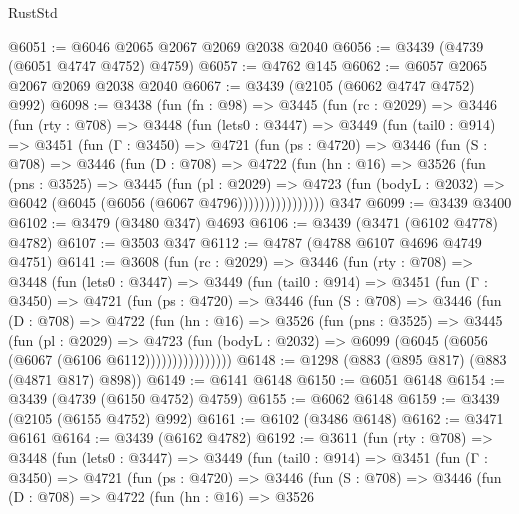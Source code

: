 \begin{lexlean}{RustStd}
\begin{coremodule}
@6051 := @6046 @2065 @2067 @2069 @2038 @2040
@6056 := @3439 (@4739 (@6051 @4747 @4752) @4759)
@6057 := @4762 @145
@6062 := @6057 @2065 @2067 @2069 @2038 @2040
@6067 := @3439 (@2105 (@6062 @4747 @4752) @992)
@6098 := @3438
    (fun (fn : @98) =>
    @3445
      (fun (rc : @2029) =>
      @3446
        (fun (rty : @708) =>
        @3448
          (fun (lets0 : @3447) =>
          @3449
            (fun (tail0 : @914) =>
            @3451
              (fun (Γ : @3450) =>
              @4721
                (fun (ps : @4720) =>
                @3446
                  (fun (S : @708) =>
                  @3446
                    (fun (D : @708) =>
                    @4722
                      (fun (hn : @16) =>
                      @3526
                        (fun (pns : @3525) =>
                        @3445
                          (fun (pl : @2029) =>
                          @4723
                            (fun (bodyL : @2032) => @6042 (@6045 (@6056 (@6067 @4796))))))))))))))))
    @347
@6099 := @3439 @3400
@6102 := @3479 (@3480 @347) @4693
@6106 := @3439 (@3471 (@6102 @4778) @4782)
@6107 := @3503 @347
@6112 := @4787 (@4788 @6107 @4696 @4749 @4751)
@6141 := @3608
    (fun (rc : @2029) =>
    @3446
      (fun (rty : @708) =>
      @3448
        (fun (lets0 : @3447) =>
        @3449
          (fun (tail0 : @914) =>
          @3451
            (fun (Γ : @3450) =>
            @4721
              (fun (ps : @4720) =>
              @3446
                (fun (S : @708) =>
                @3446
                  (fun (D : @708) =>
                  @4722
                    (fun (hn : @16) =>
                    @3526
                      (fun (pns : @3525) =>
                      @3445
                        (fun (pl : @2029) =>
                        @4723
                          (fun (bodyL : @2032) =>
                          @6099 (@6045 (@6056 (@6067 (@6106 @6112))))))))))))))))
@6148 := @1298 (@883 (@895 @817) (@883 (@4871 @817) @898))
@6149 := @6141 @6148
@6150 := @6051 @6148
@6154 := @3439 (@4739 (@6150 @4752) @4759)
@6155 := @6062 @6148
@6159 := @3439 (@2105 (@6155 @4752) @992)
@6161 := @6102 (@3486 @6148)
@6162 := @3471 @6161
@6164 := @3439 (@6162 @4782)
@6192 := @3611
    (fun (rty : @708) =>
    @3448
      (fun (lets0 : @3447) =>
      @3449
        (fun (tail0 : @914) =>
        @3451
          (fun (Γ : @3450) =>
          @4721
            (fun (ps : @4720) =>
            @3446
              (fun (S : @708) =>
              @3446
                (fun (D : @708) =>
                @4722
                  (fun (hn : @16) =>
                  @3526

\end{coremodule}
\end{lexlean}
